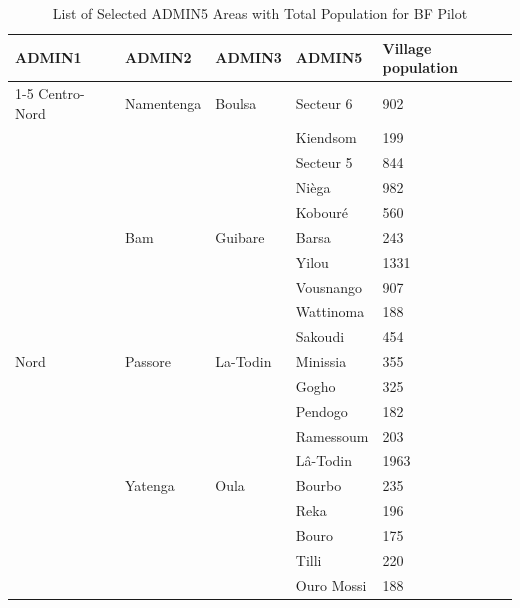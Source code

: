 \begin{table}[h]
	\caption{List of Selected ADMIN5 Areas with Total Population for BF Pilot}
    \centering
    \begin{tabular}{lllll}
    \hline\hline
       \textbf{ADMIN1} & \textbf{ADMIN2} & \textbf{ADMIN3} & \textbf{ADMIN5} & \textbf{Village population} \\	 \cline{1-5}
        Centro-Nord & Namentenga & Boulsa & Secteur 6 & 902 \\ 
        ~ & ~ & ~ & Kiendsom & 199  \\ 
        ~ & ~ & ~ & Secteur 5 & 844  \\ 
        ~ & ~ & ~ & Nièga & 982  \\ 
        ~ & ~ & ~ & Kobouré & 560  \\ 
        ~ & Bam & Guibare & Barsa & 243  \\ 
        ~ & ~ & ~ & Yilou & 1331  \\ 
        ~ & ~ & ~ & Vousnango & 907  \\ 
        ~ & ~ & ~ & Wattinoma & 188  \\ 
        ~ & ~ & ~ & Sakoudi & 454  \\ 
        Nord & Passore & La-Todin & Minissia & 355  \\ 
        ~ & ~ & ~ & Gogho & 325  \\ 
        ~ & ~ & ~ & Pendogo & 182  \\ 
        ~ & ~ & ~ & Ramessoum & 203  \\ 
        ~ & ~ & ~ & Lâ-Todin & 1963  \\ 
        ~ & Yatenga & Oula & Bourbo & 235  \\ 
        ~ & ~ & ~ & Reka & 196  \\ 
        ~ & ~ & ~ & Bouro & 175  \\ 
        ~ & ~ & ~ & Tilli & 220  \\ 
        ~ & ~ & ~ & Ouro Mossi & 188  \\ \hline\hline
    \end{tabular}
\end{table}